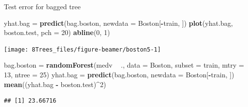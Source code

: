 \documentclass[10pt,ignorenonframetext,]{beamer}
\newenvironment{Shaded}{\begin{snugshade}}{\end{snugshade}}
\newcommand{\KeywordTok}[1]{\textcolor[rgb]{0.13,0.29,0.53}{\textbf{#1}}}
\newcommand{\DataTypeTok}[1]{\textcolor[rgb]{0.13,0.29,0.53}{#1}}
\newcommand{\DecValTok}[1]{\textcolor[rgb]{0.00,0.00,0.81}{#1}}
\newcommand{\StringTok}[1]{\textcolor[rgb]{0.31,0.60,0.02}{#1}}
\newcommand{\OperatorTok}[1]{\textcolor[rgb]{0.81,0.36,0.00}{\textbf{#1}}}
\newcommand{\NormalTok}[1]{#1}
\begin{document}
\begin{frame}[fragile]

\begin{block}{Test error for bagged tree}

\vspace{1mm}

\scriptsize

\begin{Shaded}
\begin{Highlighting}[]
\NormalTok{yhat.bag =}\StringTok{ }\KeywordTok{predict}\NormalTok{(bag.boston, }\DataTypeTok{newdata =}\NormalTok{ Boston[}\OperatorTok{-}\NormalTok{train, ])}
\KeywordTok{plot}\NormalTok{(yhat.bag, boston.test, }\DataTypeTok{pch =} \DecValTok{20}\NormalTok{)}
\KeywordTok{abline}\NormalTok{(}\DecValTok{0}\NormalTok{, }\DecValTok{1}\NormalTok{)}
\end{Highlighting}
\end{Shaded}

\begin{center}\texttt{[image: 8Trees\_files/figure-beamer/boston5-1]} \end{center}

\scriptsize

\begin{Shaded}
\begin{Highlighting}[]
\NormalTok{bag.boston =}\StringTok{ }\KeywordTok{randomForest}\NormalTok{(medv }\OperatorTok{~}\StringTok{ }\NormalTok{., }\DataTypeTok{data =}\NormalTok{ Boston, }\DataTypeTok{subset =}\NormalTok{ train, }\DataTypeTok{mtry =} \DecValTok{13}\NormalTok{, }
    \DataTypeTok{ntree =} \DecValTok{25}\NormalTok{)}
\NormalTok{yhat.bag =}\StringTok{ }\KeywordTok{predict}\NormalTok{(bag.boston, }\DataTypeTok{newdata =}\NormalTok{ Boston[}\OperatorTok{-}\NormalTok{train, ])}
\KeywordTok{mean}\NormalTok{((yhat.bag }\OperatorTok{-}\StringTok{ }\NormalTok{boston.test)}\OperatorTok{^}\DecValTok{2}\NormalTok{)}
\end{Highlighting}
\end{Shaded}

\begin{verbatim}
## [1] 23.66716
\end{verbatim}

\end{block}

\end{frame}
\end{document}
